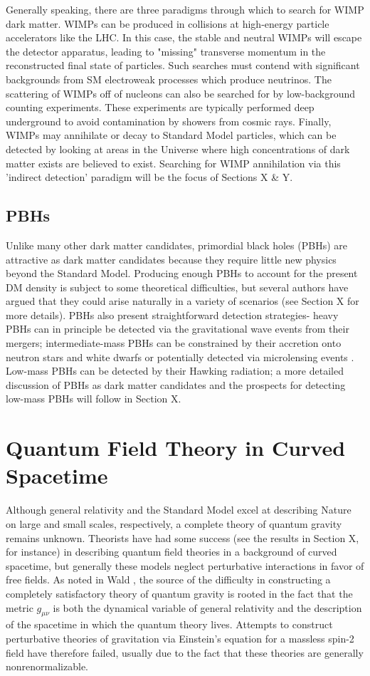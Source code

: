 Generally speaking, there are three paradigms through which to search for WIMP dark matter.
WIMPs can be produced in collisions at high-energy particle accelerators like the LHC.
In this case, the stable and neutral WIMPs will escape the detector apparatus, leading to "missing" transverse momentum in the reconstructed final state of particles.
Such searches must contend with significant backgrounds from SM electroweak processes which produce neutrinos.
The scattering of WIMPs off of nucleons can also be searched for by low-background counting experiments.
These experiments are typically performed deep underground to avoid contamination by showers from cosmic rays.
Finally, WIMPs may annihilate or decay to Standard Model particles, which can be detected by looking at areas in the Universe where high concentrations of dark matter exists are believed to exist.
Searching for WIMP annihilation via this 'indirect detection' paradigm will be the focus of Sections X \& Y. 

\subsection{PBHs}
Unlike many other dark matter candidates, primordial black holes (PBHs) are attractive as dark matter candidates because they require little new physics beyond the Standard Model.
Producing enough PBHs to account for the present DM density is subject to some theoretical difficulties, but several authors have argued that they could arise naturally in a variety of scenarios (see Section X for more details).
PBHs also present straightforward detection strategies- heavy PBHs can in principle be detected via the gravitational wave events from their mergers; intermediate-mass PBHs can be constrained by their accretion onto neutron stars and white dwarfs \cite{pani_tidal_2014} or potentially detected via microlensing events \cite{carr_primordial_2016}. Low-mass PBHs can be detected by their Hawking radiation; a more detailed discussion of PBHs as dark matter candidates and the prospects for detecting low-mass PBHs will follow in Section X. 

\section{Quantum Field Theory in Curved Spacetime}
Although general relativity and the Standard Model excel at describing Nature on large and small scales, respectively, a complete theory of quantum gravity remains unknown. Theorists have had some success (see the results in Section X, for instance) in describing quantum field theories in a background of curved spacetime, but generally these models neglect perturbative interactions in favor of free fields. 
As noted in Wald \cite{wald_general_1984}, the source of the difficulty in constructing a completely satisfactory theory of quantum gravity is rooted in the fact that the metric $g_{\mu\nu}$ is both the dynamical variable of general relativity and the description of the spacetime in which the quantum theory lives.
Attempts to construct perturbative theories of gravitation via Einstein's equation for a massless spin-2 field have therefore failed, usually due to the fact that these theories are generally nonrenormalizable.

